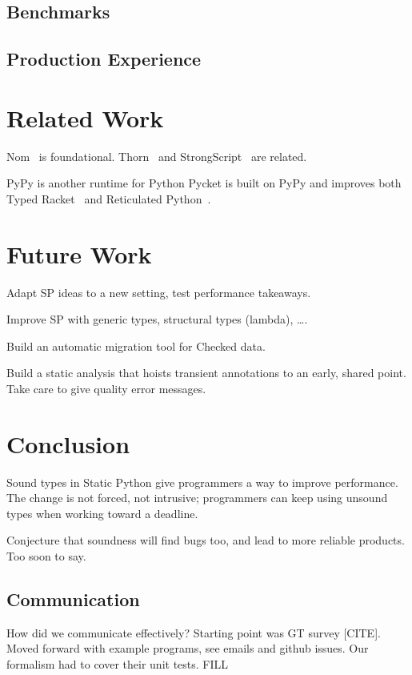 \documentclass[a4paper,english,cleveref,autoref,thm-restate,anonymous,]{lipics-v2021}
\begin{document}
\subsection{Benchmarks}


\subsection{Production Experience}


\section{Related Work}

Nom~\cite{mt-oopsla-2017} is foundational.
Thorn~\cite{wnlov-popl-2010} and StrongScript~\cite{rzv-ecoop-2015} are related.

PyPy is another runtime for Python
Pycket is built on PyPy and improves both Typed Racket~\cite{bbst-oopsla-2017}
and Reticulated Python~\cite{vsc-dls-2019}.


\section{Future Work}

Adapt SP ideas to a new setting, test performance takeaways.

Improve SP with generic types, structural types (lambda), \ldots.

Build an automatic migration tool for Checked data.

Build a static analysis that hoists transient annotations to an early, shared point.
Take care to give quality error messages.


\section{Conclusion}
\label{s:conclusion}

Sound types in Static Python give programmers a way to improve performance.
The change is not forced, not intrusive;
programmers can keep using unsound types when working toward a deadline.

Conjecture that soundness will find bugs too, and lead to more reliable products.
Too soon to say.


\subsection{Communication}

How did we communicate effectively?
Starting point was GT survey [CITE].
Moved forward with example programs, see emails and github issues.
Our formalism had to cover their unit tests.
FILL




\end{document}
